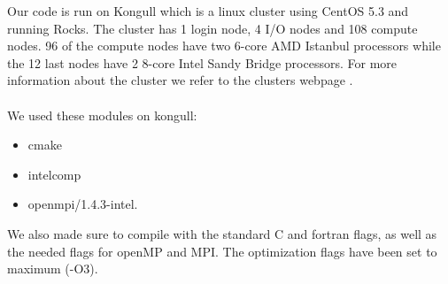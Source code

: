 Our code is run on Kongull which is a linux cluster using CentOS 5.3 and running Rocks. The cluster has 1 login node, 4 I/O nodes and 108 compute nodes. 96 of the compute nodes have two 6-core AMD Istanbul processors while the 12 last nodes have 2 8-core Intel Sandy Bridge processors. For more information about the cluster we refer to the clusters webpage \cite{kongull}. \\
\\
We used these modules on kongull:
\begin{itemize}
\item cmake
\item intelcomp
\item openmpi/1.4.3-intel.
\end{itemize}
We also made sure to compile with the standard C and fortran flags, as well as the needed flags for openMP and MPI. The optimization flags have been set to maximum (-O3).